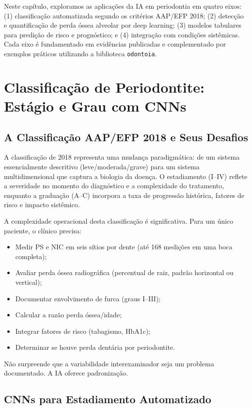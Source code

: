 Neste capítulo, exploramos as aplicações da IA em periodontia em quatro eixos: (1) classificação automatizada segundo os critérios AAP/EFP 2018; (2) detecção e quantificação de perda óssea alveolar por deep learning; (3) modelos tabulares para predição de risco e prognóstico; e (4) integração com condições sistêmicas. Cada eixo é fundamentado em evidências publicadas e complementado por exemplos práticos utilizando a biblioteca \texttt{odontoia}.

\section{Classificação de Periodontite: Estágio e Grau com CNNs}

\subsection{A Classificação AAP/EFP 2018 e Seus Desafios}

A classificação de 2018 representa uma mudança paradigmática: de um sistema essencialmente descritivo (leve/moderada/grave) para um sistema multidimensional que captura a biologia da doença. O estadiamento (I--IV) reflete a severidade no momento do diagnóstico e a complexidade do tratamento, enquanto a graduação (A--C) incorpora a taxa de progressão histórica, fatores de risco e impacto sistêmico.

A complexidade operacional desta classificação é significativa. Para um único paciente, o clínico precisa:
\begin{itemize}
    \item Medir PS e NIC em seis sítios por dente (até 168 medições em uma boca completa);
    \item Avaliar perda óssea radiográfica (percentual de raiz, padrão horizontal ou vertical);
    \item Documentar envolvimento de furca (graus I--III);
    \item Calcular a razão perda óssea/idade;
    \item Integrar fatores de risco (tabagismo, HbA1c);
    \item Determinar se houve perda dentária por periodontite.
\end{itemize}

Não surpreende que a variabilidade interexaminador seja um problema documentado. A IA oferece padronização.

\subsection{CNNs para Estadiamento Automatizado}

